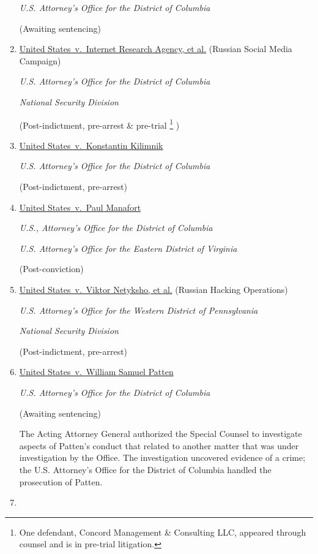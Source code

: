 \begin{enumerate}[1.]
\textit{U.S. Attorney's Office for the District of Columbia}

(Awaiting sentencing)

    \item \underline{United States~v.\ Internet Research Agency, et al.} (Russian Social Media Campaign)

\textit{U.S. Attorney's Office for the District of Columbia}

\textit{National Security Division}

(Post-indictment, pre-arrest \& pre-trial%
\footnote{One defendant, Concord Management \& Consulting LLC, appeared through counsel and is in pre-trial litigation.}
)

    \item \underline{United States~v.\ Konstantin Kilimnik}

\textit{U.S. Attorney's Office for the District of Columbia}

(Post-indictment, pre-arrest)

    \item \underline{United States~v.\ Paul Manafort}

\textit{U.S., Attorney's Office for the District of Columbia}

\textit{U.S. Attorney's Office for the Eastern District of Virginia}

(Post-conviction)

    \item \underline{United States~v.\ Viktor Netyksho, et al.} (Russian Hacking Operations)

\textit{U.S. Attorney's Office for the Western District of Pennsylvania}

\textit{National Security Division}

(Post-indictment, pre-arrest)

    \item \underline{United States~v.\ William Samuel Patten}

\textit{U.S. Attorney's Office for the District of Columbia}

(Awaiting sentencing)

The Acting Attorney General authorized the Special Counsel to investigate aspects of Patten's conduct that related to another matter that was under investigation by the Office.
The investigation uncovered evidence of a crime; the U.S. Attorney's Office for the District of Columbia handled the prosecution of Patten.

    \item \underline{}


\end{enumerate}
